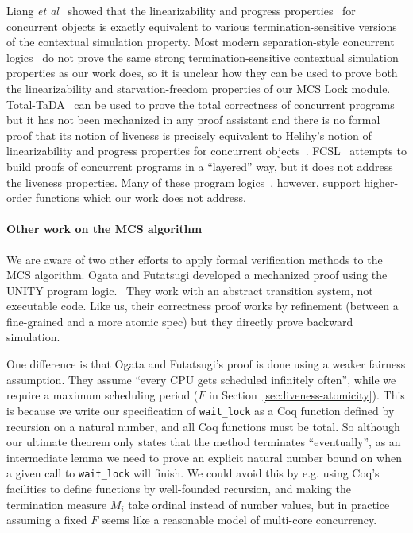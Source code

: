 
Liang {\em et al}~\cite{liang13} showed that the linearizability and
progress properties~\cite{Herlihy08book} for concurrent objects is
exactly equivalent to various termination-sensitive versions of the
contextual simulation property. Most modern separation-style
concurrent
logics~\cite{cap10,Turon13popl,sergey15pldi,pinto14,iris15,pinto16} do
not prove the same strong termination-sensitive contextual simulation
properties as our work does, so it is unclear how they can be used to
prove both the linearizability and starvation-freedom properties of
our MCS Lock module.  Total-TaDA~\cite{pinto16} can be used to prove
the total correctness of concurrent programs but it has not been
mechanized in any proof assistant and there is no formal proof that
its notion of liveness is precisely equivalent to Helihy's notion of
linearizability and progress properties for concurrent
objects~\cite{Herlihy08book}. FCSL~\cite{sergey15pldi} attempts to
build proofs of concurrent programs in a ``layered'' way, but it does
not address the liveness properties. Many of these program
logics~\cite{Turon13popl,iris15}, however, support 
higher-order functions which our work does not address.

\paragraph{Other work on the MCS algorithm}
We are aware of two other efforts to apply formal verification methods
to the MCS algorithm.  Ogata and Futatsugi developed a mechanized
proof using the UNITY program logic.~\cite{ogata:mcs-lock} They work
with an abstract transition system, not executable code. Like us,
their correctness proof works by refinement (between a fine-grained
and a more atomic spec) but they directly prove backward
simulation.

One difference is that Ogata and Futatsugi's proof is
done using a weaker fairness assumption. They assume ``every CPU gets
scheduled infinitely often'', while we require a maximum scheduling
period ($F$ in Section~\ref{sec:liveness-atomicity}).  This is because
we write our specification of \lstinline$wait_lock$ as a Coq function
defined by recursion on a natural number, and all Coq functions must
be total. So although our ultimate theorem only states that the method
terminates ``eventually'', as an intermediate lemma we need to prove
an explicit natural number bound on when a given call to
\lstinline$wait_lock$ will finish.  We could avoid this by e.g. using
Coq's facilities to define functions by well-founded recursion, and
making the termination measure $M_i$ take ordinal instead of number
values, but in practice assuming a fixed $F$ seems like a reasonable
model of multi-core concurrency.

